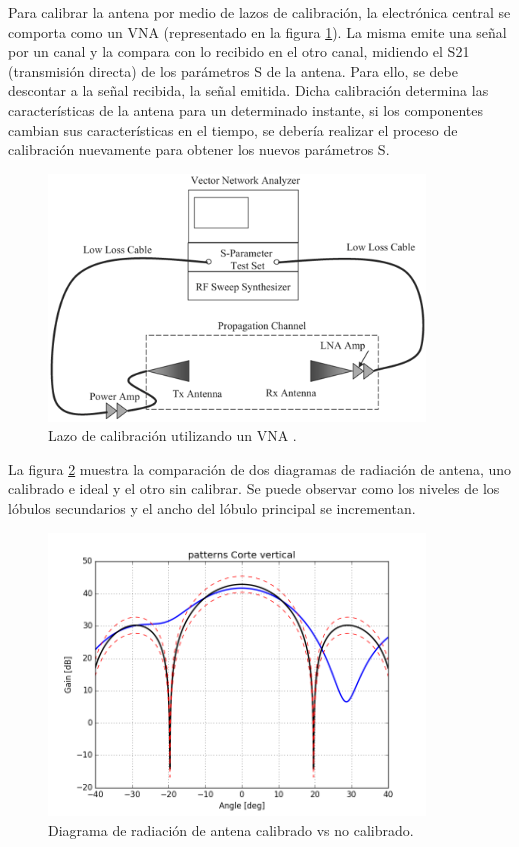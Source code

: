 Para calibrar la antena por medio de lazos de calibración, la electrónica central se comporta como un VNA (representado en la 
figura \ref{fig:calibrationLoop}). La misma emite una señal por un canal y la compara con lo recibido en el otro canal, 
midiendo el S21 (transmisión directa) de los parámetros S de la antena. Para ello, se debe descontar a la señal recibida, la 
señal emitida. Dicha calibración determina las características de la antena para un determinado instante, si los componentes 
cambian sus características en el tiempo, se debería realizar el proceso de calibración nuevamente para obtener los nuevos 
parámetros S.

\begin{figure}[H]
 \centering
 \includegraphics[width=10cm]{gfx/calibrationLoop.png}
 \caption{Lazo de calibración utilizando un VNA \cite{Reed2012}.}
 \label{fig:calibrationLoop}
\end{figure}

La figura \ref{fig:nonCalPattern} muestra la comparación de dos diagramas de radiación de antena, uno calibrado e ideal y el
otro sin calibrar. Se puede observar como los niveles de los lóbulos secundarios y el ancho del lóbulo principal se incrementan.

\begin{figure}[H]
 \centering
 \includegraphics[width=10cm]{gfx/nonCalPattern.png}
 \caption{Diagrama de radiación de antena calibrado vs no calibrado.}
 \label{fig:nonCalPattern}
\end{figure}


